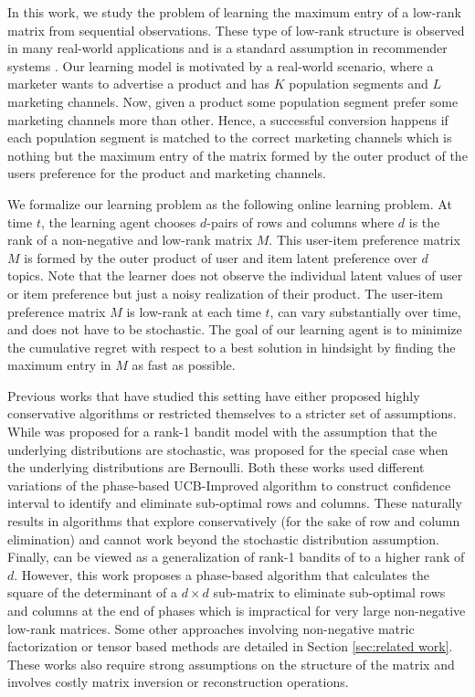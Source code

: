 In this work, we study the problem of learning the maximum entry of a low-rank matrix from sequential observations. These type of low-rank structure is observed in many real-world applications and is a standard assumption in recommender systems \citep{koren2009matrix,ricci2011liorrokach}. Our learning model is motivated by a real-world scenario, where a marketer wants to advertise a product and has $K$ population segments and $L$ marketing channels. Now, given a product some population segment prefer some marketing channels more than other. Hence, a successful conversion happens if each population segment is matched to the correct marketing channels which is nothing but the maximum entry of the matrix formed by the outer product of the users preference for the product and marketing channels.  

We formalize our learning problem as the following online learning problem. At time $t$, the learning agent chooses $d$-pairs of rows and columns where $d$ is the rank of a non-negative and low-rank matrix $M$. This user-item preference matrix $M$ is formed by the outer product of user and item latent preference over $d$ topics. Note that the learner does not observe the individual latent values of user or item preference but just a noisy realization of their product. The user-item preference matrix $M$ is low-rank at each time $t$, can vary substantially over time, and does not have to be stochastic. The goal of our learning agent is to minimize the cumulative regret with respect to a best solution in hindsight by finding the maximum entry in $M$ as fast as possible.



Previous works that have studied this setting have either proposed highly conservative algorithms or restricted themselves to a stricter set of assumptions. While \citet{katariya2016stochastic} was proposed for a rank-1 bandit model with the assumption that the underlying distributions are stochastic, \citet{katariya2017bernoulli} was proposed for the special case when the underlying distributions are Bernoulli. Both these works used different variations of the phase-based UCB-Improved \citep{auer2010ucb} algorithm to construct confidence interval to identify and eliminate sub-optimal rows and columns. These naturally results in algorithms that explore conservatively (for the sake of row and column elimination) and cannot work beyond the stochastic distribution assumption. Finally, \citet{kveton2017stochastic} can be viewed as a generalization of rank-1 bandits of \citet{katariya2016stochastic} to a higher rank of $d$. However, this work proposes a phase-based algorithm that calculates the square of the determinant of a $d\times d$ sub-matrix to eliminate sub-optimal rows and columns at the end of phases which is impractical for very large non-negative low-rank matrices. Some other approaches involving non-negative matric factorization or tensor based methods are detailed in Section \ref{sec:related work}. These works also require strong assumptions on the structure of the matrix and involves costly matrix inversion or reconstruction operations.

